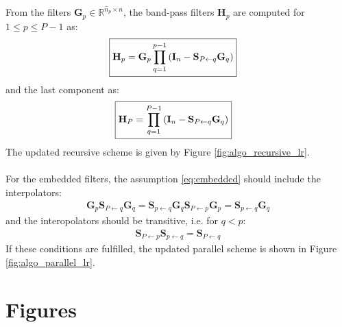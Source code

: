 \documentclass[12pt]{scrartcl}
\begin{document}
From the filters $\mathbf{G}_p \in \mathbb{R}^{\widehat{n}_p \times n}$, the band-pass filters $\mathbf{H}_p$ are computed for $1 \le p \le P-1$ as:
\begin{align}
\label{eq:band_pass_filter_lr}
\Aboxed{\mathbf{H}_p = \mathbf{G}_p \prod_{q=1}^{p-1} \left(\mathbf{I}_n - \mathbf{S}_{P \leftarrow q} \mathbf{G}_q\right)}
\end{align}
and the last component as:
\begin{align}
\Aboxed{\mathbf{H}_P = \prod_{q=1}^{P-1} \left(\mathbf{I}_n - \mathbf{S}_{P \leftarrow q} \mathbf{G}_q\right)}
\end{align}
The updated recursive scheme is given by Figure \ref{fig:algo_recursive_lr}.\\
$  $\\
For the embedded filters, the assumption \eqref{eq:embedded} should include the interpolators:
\begin{align}
\mathbf{G}_p \mathbf{S}_{P \leftarrow q} \mathbf{G}_q = \mathbf{S}_{p \leftarrow q} \mathbf{G}_q \mathbf{S}_{P \leftarrow p} \mathbf{G}_p = \mathbf{S}_{p \leftarrow q} \mathbf{G}_q
\end{align}
and the interopolators should be transitive, i.e. for $q < p$:
\begin{align}
\mathbf{S}_{P \leftarrow p} \mathbf{S}_{p \leftarrow q} = \mathbf{S}_{P \leftarrow q}
\end{align}
If these conditions are fulfilled, the updated parallel scheme is shown in Figure \ref{fig:algo_parallel_lr}.




\clearpage



\section*{Figures}
\end{document}
